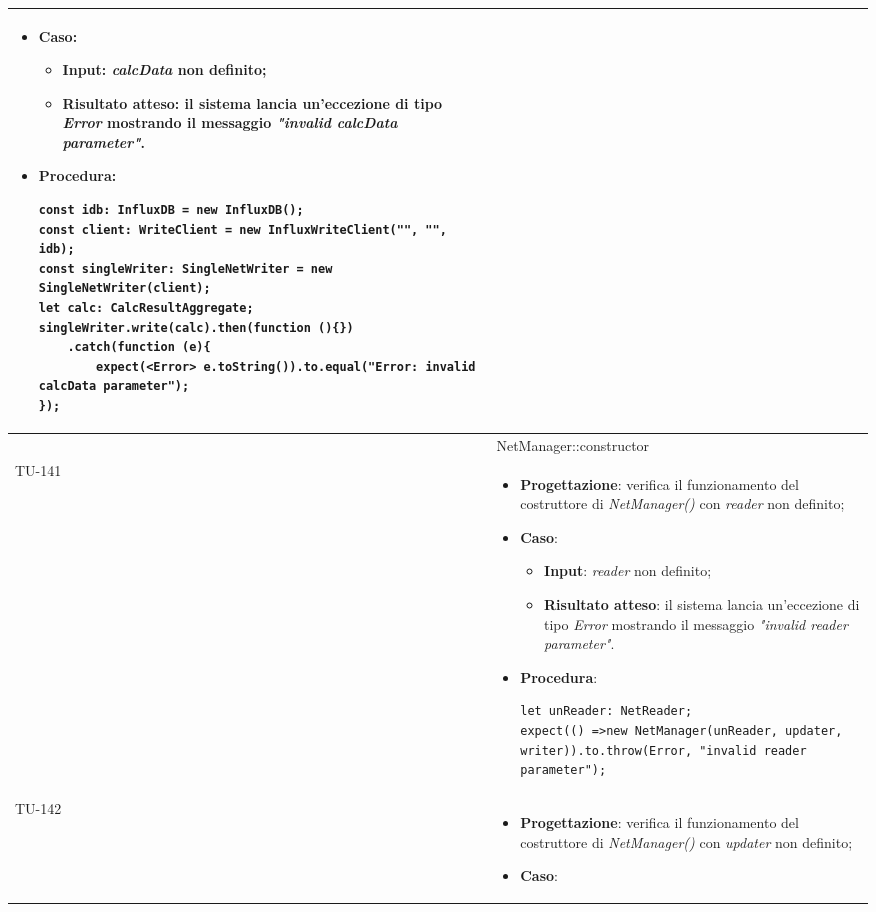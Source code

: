 \begin{longtable}{|C{1.5cm}|C{14.5cm}|}
\begin{itemize}
	\item \textbf{Caso}: 
	\begin{itemize}
		\item \textbf{Input}: \emph{calcData} non definito;
		\item \textbf{Risultato atteso}: il sistema lancia un'eccezione di tipo \emph{Error} mostrando il messaggio \emph{"invalid calcData parameter"}.
	\end{itemize}
	\item \textbf{Procedura}:
	\begin{lstlisting}
const idb: InfluxDB = new InfluxDB();
const client: WriteClient = new InfluxWriteClient("", "", idb);
const singleWriter: SingleNetWriter = new SingleNetWriter(client);
let calc: CalcResultAggregate;
singleWriter.write(calc).then(function (){})
	.catch(function (e){
		expect(<Error> e.toString()).to.equal("Error: invalid calcData parameter");
});
	\end{lstlisting}
\end{itemize}\\
\hline
{} & NetManager::constructor
\\ \hline
{TU-141} &
\begin{itemize}
	\item \textbf{Progettazione}: verifica il funzionamento del costruttore di \emph{NetManager()} con \emph{reader} non definito;
	\item \textbf{Caso}: 
	\begin{itemize}
		\item \textbf{Input}: \emph{reader} non definito;
		\item \textbf{Risultato atteso}: il sistema lancia un'eccezione di tipo \emph{Error} mostrando il messaggio \emph{"invalid reader parameter"}.
	\end{itemize}
	\item \textbf{Procedura}:
	\begin{lstlisting}
let unReader: NetReader;
expect(() =>new NetManager(unReader, updater, writer)).to.throw(Error, "invalid reader parameter");
	\end{lstlisting}
\end{itemize}\\
\hline
{TU-142} &
\begin{itemize}
	\item \textbf{Progettazione}: verifica il funzionamento del costruttore di \emph{NetManager()} con \emph{updater} non definito;
	\item \textbf{Caso}: 
	\begin{itemize}

\end{itemize}
\end{itemize}
\end{longtable}
